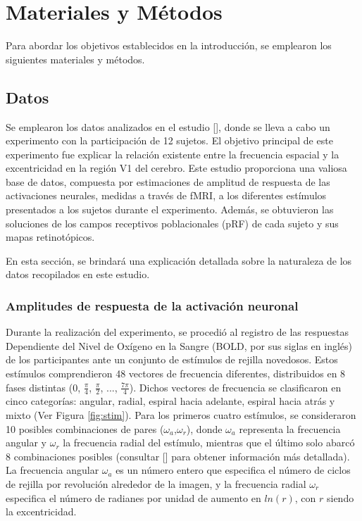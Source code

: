 \chapter{Materiales y M\'etodos}\label{chapter:materials_and_methods}

Para abordar los objetivos establecidos en la introducción, se emplearon los siguientes materiales y métodos.

\section{Datos}

Se emplearon los datos analizados en el estudio [\cite{broderick_mapping_2022}], donde se lleva a cabo un experimento con la participación de 12 sujetos. El objetivo principal de este experimento fue explicar la relación existente entre la frecuencia espacial y la excentricidad en la región V1 del cerebro. Este estudio proporciona una valiosa base de datos, compuesta por estimaciones de amplitud de respuesta de las activaciones neurales, medidas a trav\'es de fMRI, a los diferentes estímulos presentados a los sujetos durante el experimento. Además, se obtuvieron las soluciones de los campos receptivos poblacionales (pRF) de cada sujeto y sus mapas retinot\'opicos.

En esta sección, se brindará una explicación detallada sobre la naturaleza de los datos recopilados en este estudio.

\subsection{Amplitudes de respuesta de la activaci\'on neuronal}

Durante la realización del experimento, se procedió al registro de las respuestas Dependiente del Nivel de Oxígeno en la Sangre (BOLD, por sus siglas en ingl\'es) de los participantes ante un conjunto de est\'imulos de rejilla novedosos. Estos estímulos comprendieron 48 vectores de frecuencia diferentes, distribuidos en 8 fases distintas (0, $\frac{\pi}{4}$, $\frac{\pi}{2}$, ..., $\frac{7\pi}{4}$). Dichos vectores de frecuencia se clasificaron en cinco categorías: angular, radial, espiral hacia adelante, espiral hacia atrás y mixto  (Ver Figura \ref{fig:stim}). Para los primeros cuatro estímulos, se consideraron 10 posibles combinaciones de pares ($\omega_a$,$\omega_r$), donde $\omega_a$ representa la frecuencia angular y $\omega_r$ la frecuencia radial del estímulo, mientras que el último solo abarcó 8 combinaciones posibles (consultar [\cite{broderick_mapping_2022}] para obtener información más detallada). La frecuencia angular $\omega_a$ es un número entero que especifica el número de ciclos de rejilla por revolución alrededor de la imagen, y la frecuencia radial $\omega_r$ especifica el número de radianes por unidad de aumento en $ln(r)$, con $r$ siendo la excentricidad.

